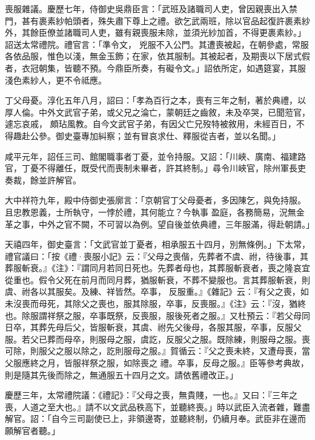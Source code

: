 \begin{pinyinscope}
 喪服雜議。慶歷七年，侍御史吳鼎臣言：「武班及諸職司人吏，曾因親喪出入禁門，甚有裹素紗帕頭者，殊失肅下尊上之禮。欲乞武兩班，除以官品起復許裹素紗外，其餘臣僚並諸職司人吏，雖有親喪服未除，並須光紗加首，不得更裹素紗。」詔送太常禮院。禮官言：「準令文，
 兇服不入公門。其遭喪被起，在朝參處，常服各依品服，惟色以淺，無金玉飾；在家，依其服制。其被起者，及期喪以下居式假者，衣冠朝集，皆聽不預。今鼎臣所奏，有礙令文。」詔依所定，如遇筵宴，其服淺色素紗人，更不令祗應。



 丁父母憂。淳化五年八月，詔曰：「孝為百行之本，喪有三年之制，著於典禮，以厚人倫。中外文武官子弟，或父兄之淪亡，蒙朝廷之齒敘，未及卒哭，已聞蒞官，遽忘哀戚，
 頗玷風教。自今文武官子弟，有因父亡兄歿特被敘用，未經百日，不得趣赴公參。御史臺專加糾察；並有冒哀求仕、釋服從吉者，並以名聞。」



 咸平元年，詔任三司、館閣職事者丁憂，並令持服。又詔：「川峽、廣南、福建路官，丁憂不得離任，既受代而喪制未畢者，許其終制。」尋令川峽官，除州軍長吏奏裁，餘並許解官。



 大中祥符九年，殿中侍御史張廓言：「京朝官丁父母憂者，多因陳乞，與免持服。且忠教恩義，士所執守，一悖於禮，其何能立？今執事
 盈庭，各務簡易，況無金革之事，中外之官不闕，不可習以為例。望自後並依典禮，三年服滿，得赴朝請。」



 天禧四年，御史臺言：「文武官並丁憂者，相承服五十四月，別無條例。」下太常，禮官議曰：「按《禮·喪服小記》云：『父母之喪偕，先葬者不虞、祔，待後事，其葬服斬衰。』《注》：『謂同月若同日死也。先葬者母也，其葬服斬衰者，喪之隆哀宜從重也。假令父死在前月而同月葬，猶服斬衰，不葬不變服也。言其葬服斬衰，則虞、祔各以其服矣。及練、祥皆然。卒事，
 反服重。』《雜記》云：『有父之喪，如未沒喪而母死，其除父之喪也，服其除服，卒事，反喪服。』《注》云：『沒，猶終也。除服謂祥祭之服，卒事既祭，反喪服，服後死者之服。』又杜預云：『若父母同日卒，其葬先母后父，皆服斬衰，其虞、祔先父後母，各服其服，卒事，反服父服。若父已葬而母卒，則服母之服，虞訖，反服父之服。既除練，則服母之服。喪可除，則服父之服以除之，訖則服母之服。』賀循云：『父之喪未終，又遭母喪，當父服應終之月，皆服祥祭之服，如除喪之
 禮。卒事，反母之服。』臣等參考典故，則是隨其先後而除之，無通服五十四月之文。請依舊禮改正。」



 慶歷三年，太常禮院議：《禮記》：『父母之喪，無貴賤，一也。』又曰：『三年之喪，人道之至大也。』請不以文武品秩高下，並聽終喪。」時以武臣入流者雜，難盡解官。詔：「自今三司副使已上，非領邊寄，並聽終制，仍續月奉。武臣非在邊而願解官者聽。」




\end{pinyinscope}
